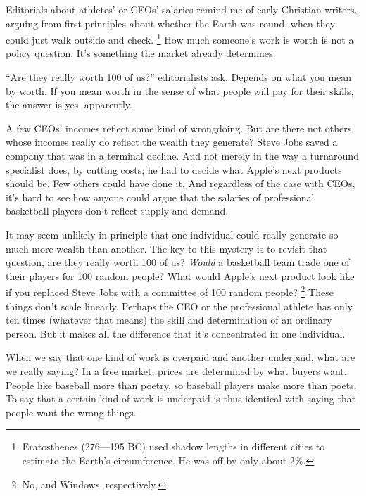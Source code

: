 \documentclass[12pt]{book}
\begin{document}
Editorials about athletes' or CEOs' salaries remind me of early
Christian writers, arguing from first principles about whether the Earth
was round, when they could just walk outside and check.
\footnote{Eratosthenes (276---195 BC) used shadow lengths in different
cities to estimate the Earth's circumference. He was off by only about
2\%.} How much someone's work is worth is not a policy
question. It's something the market already determines.

``Are they really worth 100 of us?'' editorialists ask. Depends on what
you mean by worth. If you mean worth in the sense of what people will
pay for their skills, the answer is yes, apparently.

A few CEOs' incomes reflect some kind of wrongdoing. But are there not
others whose incomes really do reflect the wealth they generate? Steve
Jobs saved a company that was in a terminal decline. And not merely in
the way a turnaround specialist does, by cutting costs; he had to decide
what Apple's next products should be. Few others could have done it. And
regardless of the case with CEOs, it's hard to see how anyone could
argue that the salaries of professional basketball players don't reflect
supply and demand.

It may seem unlikely in principle that one individual could really
generate so much more wealth than another. The key to this mystery is to
revisit that question, are they really worth 100 of us? \emph{Would} a
basketball team trade one of their players for 100 random people? What
would Apple's next product look like if you replaced Steve Jobs with a
committee of 100 random people? \footnote{No, and Windows, respectively.} These things
don't scale linearly. Perhaps the CEO or the professional athlete has
only ten times (whatever that means) the skill and determination of an
ordinary person. But it makes all the difference that it's concentrated
in one individual.

When we say that one kind of work is overpaid and another underpaid,
what are we really saying? In a free market, prices are determined by
what buyers want. People like baseball more than poetry, so baseball
players make more than poets. To say that a certain kind of work is
underpaid is thus identical with saying that people want the wrong
things.
\end{document}
